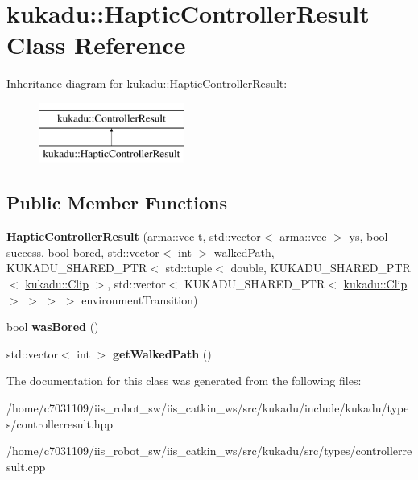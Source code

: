 \hypertarget{classkukadu_1_1HapticControllerResult}{\section{kukadu\-:\-:Haptic\-Controller\-Result Class Reference}
\label{classkukadu_1_1HapticControllerResult}
}
Inheritance diagram for kukadu\-:\-:Haptic\-Controller\-Result\-:\begin{figure}[H]
\begin{center}
\leavevmode
\includegraphics[height=2.000000cm]{classkukadu_1_1HapticControllerResult}
\end{center}
\end{figure}
\subsection*{Public Member Functions}
\begin{DoxyCompactItemize}
\item 
\hypertarget{classkukadu_1_1HapticControllerResult_a47345ffc29dd31ecb607327272e22f77}{{\bfseries Haptic\-Controller\-Result} (arma\-::vec t, std\-::vector$<$ arma\-::vec $>$ ys, bool success, bool bored, std\-::vector$<$ int $>$ walked\-Path, K\-U\-K\-A\-D\-U\-\_\-\-S\-H\-A\-R\-E\-D\-\_\-\-P\-T\-R$<$ std\-::tuple$<$ double, K\-U\-K\-A\-D\-U\-\_\-\-S\-H\-A\-R\-E\-D\-\_\-\-P\-T\-R$<$ \hyperlink{classkukadu_1_1Clip}{kukadu\-::\-Clip} $>$, std\-::vector$<$ K\-U\-K\-A\-D\-U\-\_\-\-S\-H\-A\-R\-E\-D\-\_\-\-P\-T\-R$<$ \hyperlink{classkukadu_1_1Clip}{kukadu\-::\-Clip} $>$ $>$ $>$ $>$ environment\-Transition)}\label{classkukadu_1_1HapticControllerResult_a47345ffc29dd31ecb607327272e22f77}

\item 
\hypertarget{classkukadu_1_1HapticControllerResult_a9de0d818f4846a50824982a206093174}{bool {\bfseries was\-Bored} ()}\label{classkukadu_1_1HapticControllerResult_a9de0d818f4846a50824982a206093174}

\item 
\hypertarget{classkukadu_1_1HapticControllerResult_ad22c014f12ae0bff2c24edc4cce7fd32}{std\-::vector$<$ int $>$ {\bfseries get\-Walked\-Path} ()}\label{classkukadu_1_1HapticControllerResult_ad22c014f12ae0bff2c24edc4cce7fd32}

\end{DoxyCompactItemize}


The documentation for this class was generated from the following files\-:\begin{DoxyCompactItemize}
\item 
/home/c7031109/iis\-\_\-robot\-\_\-sw/iis\-\_\-catkin\-\_\-ws/src/kukadu/include/kukadu/types/controllerresult.\-hpp\item 
/home/c7031109/iis\-\_\-robot\-\_\-sw/iis\-\_\-catkin\-\_\-ws/src/kukadu/src/types/controllerresult.\-cpp\end{DoxyCompactItemize}
